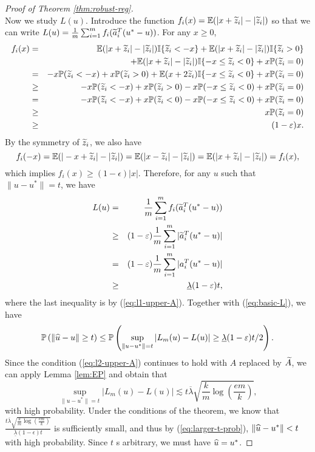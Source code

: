\begin{proof}[Proof of Theorem \ref{thm:robust-reg}]
\begin{equation}
\end{equation}
Now we study $L(u)$. Introduce the function $f_i(x)=\mathbb{E}(|x+\widetilde{z}_i|-|\widetilde{z}_i|)$ so that we can write $L(u)=\frac{1}{m}\sum_{i=1}^mf_i(\widetilde{a}_i^T(u^*-u))$. For any $x\geq 0$,
\begin{eqnarray*}
f_i(x) &=& \mathbb{E}(|x+\wt{z}_i|-|\wt{z}_i|)\mathbb{I}\{\wt{z}_i<-x\} + \mathbb{E}(|x+\wt{z}_i|-|\wt{z}_i|)\mathbb{I}\{\wt{z}_i> 0\} \\
&& + \mathbb{E}(|x+\wt{z}_i|-|\wt{z}_i|)\mathbb{I}\{-x\leq \wt{z}_i< 0\} + x\mathbb{P}(\wt{z}_i=0) \\
&=& -x\mathbb{P}(\wt{z}_i<-x) + x\mathbb{P}(\wt{z}_i> 0) + \mathbb{E}(x+2\wt{z}_i)\mathbb{I}\{-x\leq \wt{z}_i<0\}   + x\mathbb{P}(\wt{z}_i=0) \\
&\geq& -x\mathbb{P}(\wt{z}_i<-x) + x\mathbb{P}(\wt{z}_i> 0) - x\mathbb{P}(-x\leq \wt{z}_i< 0)   + x\mathbb{P}(\wt{z}_i=0) \\
&=& -x\mathbb{P}(\wt{z}_i<-x) + x\mathbb{P}(\wt{z}_i< 0) - x\mathbb{P}(-x\leq \wt{z}_i< 0)  + x\mathbb{P}(\wt{z}_i=0) \\
&\geq& x\mathbb{P}(\wt{z}_i=0) \\
&\geq& (1-\epsilon)x.
\end{eqnarray*}
By the symmetry of $\widetilde{z}_i$, we also have
$$f_i(-x)=\mathbb{E}(|-x+\widetilde{z}_i|-|\widetilde{z}_i|)=\mathbb{E}(|x-\widetilde{z}_i|-|\widetilde{z}_i|)=\mathbb{E}(|x+\widetilde{z}_i|-|\widetilde{z}_i|)=f_i(x),$$
which implies $f_i(x)\geq (1-\epsilon)|x|$. Therefore, for any $u$ such that $\|u-u^*\|=t$, we have
\begin{eqnarray*}
L(u) &=& \frac{1}{m}\sum_{i=1}^mf_i(\wt{a}_i^T(u^*-u)) \\
&\geq& (1-\epsilon)\frac{1}{m}\sum_{i=1}^m|\wt{a}_i^T(u^*-u)| \\
&=& (1-\epsilon)\frac{1}{m}\sum_{i=1}^m|a_i^T(u^*-u)| \\
&\geq& \underline{\lambda}(1-\epsilon)t,
\end{eqnarray*}
where the last inequality is by (\ref{eq:l1-upper-A}). Together with (\ref{eq:basic-L}), we have
\begin{equation}
\mathbb{P}\left(\|\wh{u}-u\|\geq t\right) \leq \mathbb{P}\left(\sup_{\|u-u^*\|= t}|L_m(u)-L(u)| \geq \underline{\lambda}(1-\epsilon)t/2\right). \label{eq:larger-t-prob}
\end{equation}
Since the condition (\ref{eq:l2-upper-A}) continues to hold with $A$ replaced by $\widetilde{A}$, we can apply Lemma \ref{lem:EP} and obtain that
$$\sup_{\|u-u^*\|= t}|L_m(u)-L(u)| \lesssim t\overline{\lambda}\sqrt{\frac{k}{m}\log\left(\frac{em}{k}\right)},$$
with high probability. Under the conditions of the theorem, we know that $\frac{t\overline{\lambda}\sqrt{\frac{k}{m}\log\left(\frac{em}{k}\right)}}{\underline{\lambda}(1-\epsilon)t}$ is sufficiently small, and thus by (\ref{eq:larger-t-prob}), $\|\widehat{u}-u^*\|<t$ with high probability. Since $t$ s arbitrary, we must have $\widehat{u}=u^*$.
\end{proof}


